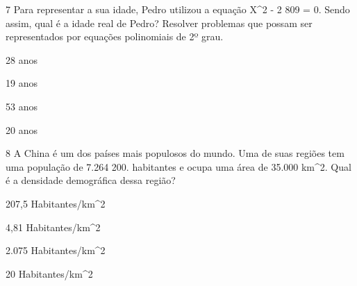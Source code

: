 








\num{7} Para representar a sua idade, Pedro utilizou a equação X^2 - 2 809 =
0. Sendo assim, qual é a idade real de Pedro? Resolver problemas que
possam ser representados por equações polinomiais de 2º grau.
\item 28 anos
\item 19 anos
\item 53 anos
\item 20 anos











\num{8} A China é um dos países mais populosos do mundo. Uma de suas regiões
tem uma população de 7.264 200. habitantes e ocupa uma área de 35.000
km^2. Qual é a densidade demográfica dessa região?
\item 207,5 Habitantes/km^2
\item 4,81 Habitantes/km^2
\item 2.075 Habitantes/km^2
\item 20 Habitantes/km^2

